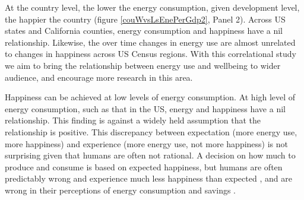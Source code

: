 \documentclass[10pt, letterpaper]{article}
\begin{document}
\begin{spacing}{1.5}
At the country level,  the lower the energy consumption, given development
level, the happier the country (figure \ref{couWvsLsEnePerGdp2}, Panel 2).  Across US states and California counties,
energy consumption and happiness have a nil relationship. 
Likewise, the over time changes in energy use are almost unrelated to changes in
 happiness across US Census regions. 
With this correlational study we aim to bring the relationship between energy
use and wellbeing to wider audience, and encourage more research in this area. 


Happiness can be achieved at low levels of
energy consumption. At high level of energy consumption, such as
that in the  US, energy and happiness have a nil relationship. %
 This finding is against a widely held assumption that the relationship is
positive. This discrepancy between expectation (more energy use, more happiness)
and experience (more energy use, not more happiness) is not surprising given
that humans are often not rational. A decision on how much to produce and consume is based on
 expected happiness, but humans are often predictably wrong and experience much
 less happiness than expected \citep{kahneman97ws}, and are wrong
 in their perceptions of energy consumption and savings \citep{attari10,dietz14B}. 




\end{spacing}
\end{document}
